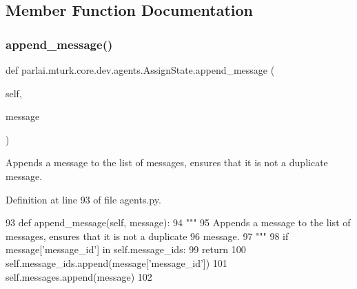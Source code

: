 \subsection{Member Function Documentation}
\mbox{\label{classparlai_1_1mturk_1_1core_1_1dev_1_1agents_1_1AssignState_a56c2f2e29ac46d90afcc248a4ef1d508}} 
\subsubsection{\texorpdfstring{append\+\_\+message()}{append\_message()}}
{\footnotesize\ttfamily def parlai.\+mturk.\+core.\+dev.\+agents.\+Assign\+State.\+append\+\_\+message (\begin{DoxyParamCaption}\item[{}]{self,  }\item[{}]{message }\end{DoxyParamCaption})}

\begin{DoxyVerb}Appends a message to the list of messages, ensures that it is not a duplicate
message.
\end{DoxyVerb}
 

Definition at line 93 of file agents.\+py.


\begin{DoxyCode}
93     \textcolor{keyword}{def }append\_message(self, message):
94         \textcolor{stringliteral}{"""}
95 \textcolor{stringliteral}{        Appends a message to the list of messages, ensures that it is not a duplicate}
96 \textcolor{stringliteral}{        message.}
97 \textcolor{stringliteral}{        """}
98         \textcolor{keywordflow}{if} message[\textcolor{stringliteral}{'message\_id'}] \textcolor{keywordflow}{in} self.message\_ids:
99             \textcolor{keywordflow}{return}
100         self.message\_ids.append(message[\textcolor{stringliteral}{'message\_id'}])
101         self.messages.append(message)
102 
\end{DoxyCode}
\mbox{\label{classparlai_1_1mturk_1_1core_1_1dev_1_1agents_1_1AssignState_af232f8d1724c7f525c0c489b80395299}} 
